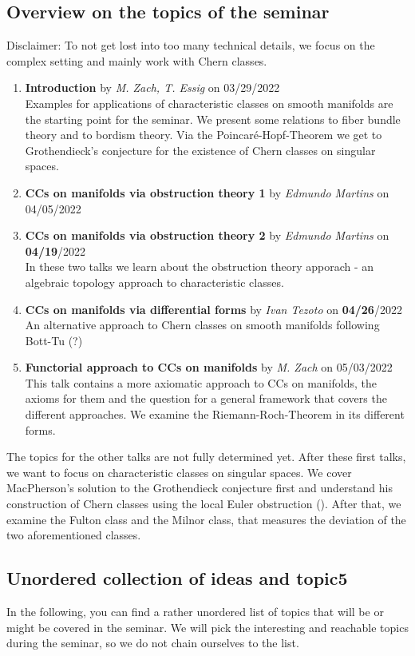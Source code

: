 \documentclass[a4paper]{article}
\begin{document}
\subsection*{Overview on the topics of the seminar}
Disclaimer: To not get lost into too many technical details, we focus on the complex setting
and mainly work with Chern classes.

\begin{enumerate}
\item \textbf{Introduction} by \emph{M. Zach, T. Essig} on 03/29/2022 \\
	Examples for applications of characteristic classes on smooth manifolds are the
	starting point for the seminar. We present some relations to fiber bundle theory 
	and to bordism theory. Via the Poincar\'e-Hopf-Theorem we get to Grothendieck's 
	conjecture for the existence of Chern classes on singular spaces.
\item \textbf{CCs on manifolds via obstruction theory 1} by \emph{Edmundo Martins} on 04/05/2022
\item \textbf{CCs on manifolds via obstruction theory 2} by \emph{Edmundo Martins} on \textbf{04/19}/2022\\
	In these two talks we learn about the obstruction theory apporach - an algebraic 
	topology approach to characteristic classes.
\item \textbf{CCs on manifolds via differential forms} by \emph{Ivan Tezoto} on \textbf{04/26}/2022 \\
	An alternative approach to Chern classes on smooth manifolds following Bott-Tu (?)
\item \textbf{Functorial approach to CCs on manifolds} by \emph{M. Zach} on 05/03/2022 \\
	This talk contains a more axiomatic approach to CCs on manifolds, the axioms
	for them and the question for a general framework that covers the different approaches.
	We examine the Riemann-Roch-Theorem in its different forms.
\end{enumerate}
The topics for the other talks are not fully determined yet. After these first talks, we want
to focus on characteristic classes on singular spaces. We cover MacPherson's solution to 
the Grothendieck conjecture first and understand his construction of Chern classes using the
local Euler obstruction (\cite{MacPherson74,Parusinski06}). After that, we examine the Fulton 
class and the Milnor class, that measures the deviation of the two aforementioned classes.

\subsection*{Unordered collection of ideas and topic5}
In the following, you can find a rather unordered list of topics that will be or might be
covered in the seminar. We will pick the interesting and reachable topics during the seminar,
so we do not chain ourselves to the list.
\end{document}
